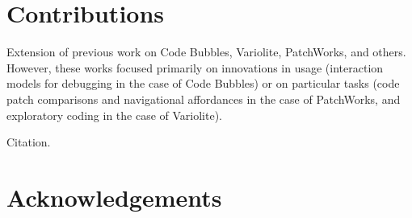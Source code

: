 \documentclass{ppig}
\begin{document}
\section{Contributions}
Extension of previous work on Code Bubbles, Variolite, PatchWorks, and others. However, these works focused primarily on innovations in usage (interaction models for debugging in the case of Code Bubbles) or on particular tasks (code patch comparisons and navigational affordances in the case of PatchWorks, and exploratory coding in the case of Variolite).

Citation\cite{blackwell1999how}.

\section{Acknowledgements}


 
\end{document}
